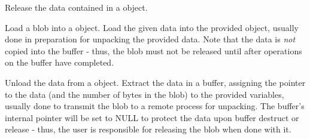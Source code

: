 
Release the data contained in a  object.


\begin{arglist}
\end{arglist}



Load a blob into a  object.
Load the given data into the provided  object, usually done in preparation for unpacking the provided data. Note that the data is \textit{not} copied into the buffer - thus, the blob must not be released until after operations on the buffer have completed.


\begin{arglist}
\end{arglist}


Unload the data from a  object.
Extract the data in a buffer, assigning the pointer to the data (and the number of bytes in the blob) to the provided variables, usually done to transmit the blob to a remote process for unpacking. The buffer's internal pointer will be set to NULL to protect the data upon buffer destruct or release - thus, the user is responsible for releasing the blob when done with it.


\begin{arglist}
\end{arglist}


